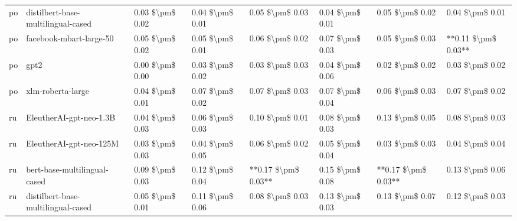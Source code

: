 \begin{tabular}{llllllll}
      po & distilbert-base-multilingual-cased & 0.03 \$\textbackslash pm\$ 0.02 &           0.04 \$\textbackslash pm\$ 0.01 &       0.05 \$\textbackslash pm\$ 0.03 &        0.04 \$\textbackslash pm\$ 0.01 &                         0.05 \$\textbackslash pm\$ 0.02 &     0.04 \$\textbackslash pm\$ 0.01 \\
      po &            facebook-mbart-large-50 & 0.05 \$\textbackslash pm\$ 0.02 &           0.05 \$\textbackslash pm\$ 0.01 &       0.06 \$\textbackslash pm\$ 0.02 &        0.07 \$\textbackslash pm\$ 0.03 &                         0.05 \$\textbackslash pm\$ 0.03 & **0.11 \$\textbackslash pm\$ 0.03** \\
      po &                               gpt2 & 0.00 \$\textbackslash pm\$ 0.00 &           0.03 \$\textbackslash pm\$ 0.02 &       0.03 \$\textbackslash pm\$ 0.03 &        0.04 \$\textbackslash pm\$ 0.06 &                         0.02 \$\textbackslash pm\$ 0.02 &     0.03 \$\textbackslash pm\$ 0.02 \\
      po &                  xlm-roberta-large & 0.04 \$\textbackslash pm\$ 0.01 &           0.07 \$\textbackslash pm\$ 0.02 &       0.07 \$\textbackslash pm\$ 0.03 &        0.07 \$\textbackslash pm\$ 0.04 &                         0.06 \$\textbackslash pm\$ 0.03 &     0.07 \$\textbackslash pm\$ 0.02 \\
      ru &            EleutherAI-gpt-neo-1.3B & 0.04 \$\textbackslash pm\$ 0.03 &           0.06 \$\textbackslash pm\$ 0.03 &       0.10 \$\textbackslash pm\$ 0.01 &        0.08 \$\textbackslash pm\$ 0.03 &                         0.13 \$\textbackslash pm\$ 0.05 &     0.08 \$\textbackslash pm\$ 0.03 \\
      ru &            EleutherAI-gpt-neo-125M & 0.03 \$\textbackslash pm\$ 0.03 &           0.04 \$\textbackslash pm\$ 0.05 &       0.06 \$\textbackslash pm\$ 0.02 &        0.05 \$\textbackslash pm\$ 0.04 &                         0.03 \$\textbackslash pm\$ 0.03 &     0.04 \$\textbackslash pm\$ 0.04 \\
      ru &       bert-base-multilingual-cased & 0.09 \$\textbackslash pm\$ 0.03 &           0.12 \$\textbackslash pm\$ 0.04 &   **0.17 \$\textbackslash pm\$ 0.03** &        0.15 \$\textbackslash pm\$ 0.08 &                     **0.17 \$\textbackslash pm\$ 0.03** &     0.13 \$\textbackslash pm\$ 0.06 \\
      ru & distilbert-base-multilingual-cased & 0.05 \$\textbackslash pm\$ 0.01 &           0.11 \$\textbackslash pm\$ 0.06 &       0.08 \$\textbackslash pm\$ 0.03 &        0.13 \$\textbackslash pm\$ 0.03 &                         0.13 \$\textbackslash pm\$ 0.07 &     0.12 \$\textbackslash pm\$ 0.03 \\

\end{tabular}
